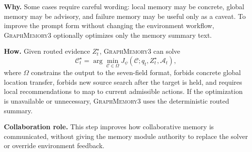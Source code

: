 \documentclass[11pt]{article}
\newcommand{\modelname}{\textsc{GraphMemory3}\xspace}
\newcommand{\actions}{\mathcal{A}}
\begin{document}
\textbf{Why.} Some cases require careful wording: local memory may be concrete,
global memory may be advisory, and failure memory may be useful only as a caveat.
To improve the prompt form without changing the environment workflow, \modelname
optionally optimizes only the memory summary text.

\textbf{How.} Given routed evidence $Z_t^\star$, \modelname can solve
\begin{equation}
    \mathcal{C}^{\star}_t =
    \arg\min_{\mathcal{C}\in\Omega}
    J_{\psi}
    \left(
    \mathcal{C};
    q_t,Z_t^\star,\actions_t
    \right),
\end{equation}
where $\Omega$ constrains the output to the seven-field format, forbids concrete
global location transfer, forbids new source search after the target is held, and
requires local recommendations to map to current admissible actions. If the
optimization is unavailable or unnecessary, \modelname uses the deterministic
routed summary.

\textbf{Collaboration role.} This step improves how collaborative memory is
communicated, without giving the memory module authority to replace the solver or
override environment feedback.
\end{document}
